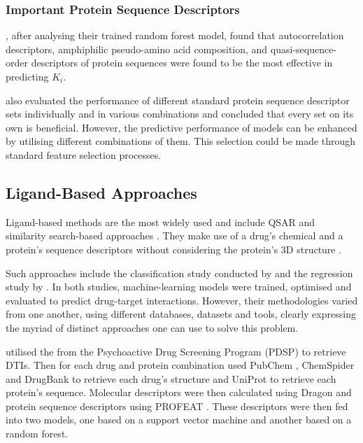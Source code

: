 \subsubsection{Important Protein Sequence Descriptors}
\label{subsubsec:Important_Protein_Sequence_Descriptors}

\citet{Shar2016}, after analysing their trained random forest model, found that autocorrelation descriptors, amphiphilic pseudo-amino acid composition, and quasi-sequence-order descriptors of protein sequences were found to be the most effective in predicting $K_i$. 

\citet{Ong2007} also evaluated the performance of different standard protein sequence descriptor sets individually and in various combinations and concluded that every set on its own is beneficial. However, the predictive performance of models can be enhanced by utilising different combinations of them. This selection could be made through standard feature selection processes.

\subsection{Ligand-Based Approaches}

Ligand-based methods are the most widely used and include QSAR and similarity search-based approaches \citep{Shar2016}. They make use of a 
drug's chemical and a protein's sequence descriptors without considering the protein's 3D structure \citep{Aparoy2012}.

Such approaches include the classification study conducted by \citet{Wang2020} and the regression study by \cite{Shar2016}. In both studies, machine-learning models were trained, optimised and evaluated to predict drug-target interactions.
However, their methodologies varied from one another, using different databases, datasets and tools, clearly expressing the myriad of distinct approaches one can use to solve this problem.

\citet{Shar2016} utilised the \citet{Ki_Database} from the Psychoactive Drug Screening Program (PDSP) \citep{Ki_Database_Paper} to retrieve DTIs. Then for each drug and protein combination used PubChem \citep{PubChem}, ChemSpider \citep{ChemSpider} and DrugBank \citep{DrugBank} to retrieve each drug's structure and UniProt \citep{UniProt_Paper} to retrieve each protein's sequence. Molecular descriptors were then calculated using Dragon \citep{DRAGON} and protein sequence descriptors using PROFEAT \citep{PROFEAT}. These descriptors were then fed into two models, one based on a support vector machine and another based on a random forest. 

